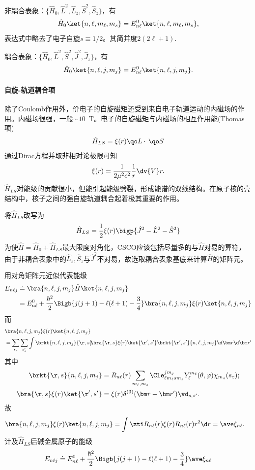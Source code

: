 非耦合表象：$\{\hat H_0,\hat L^2,\hat L_z,\hat S^2,\hat S_z\}$，有 %
\[
	\hat H_0\ket{n,\ell,m_\ell,m_s}=E_{n\ell}^0\ket{n,\ell,m_\ell,m_s},
\]
表达式中略去了电子自旋$s\equiv 1/2$。其简并度$2(2\ell+1)$.

耦合表象：$\{\hat H_0,\hat L^2,\hat S^2,\hat J^2,\hat J_z\}$，有 
\[
	\hat H_0\ket{n,\ell,j,m_j}=E_{n\ell}^0\ket{n,\ell,j,m_j}.
\]
\paragraph{自旋-轨道耦合项}
除了Coulomb作用外，价电子的自旋磁矩还受到来自电子轨道运动的内磁场的作用。内磁场很强，一般$\sim10$~T。电子的自旋磁矩与内磁场的相互作用能(Thomas项)
\begin{align}
	\hat H_{LS}=\xi(r)\qo L\cdot\,\qo S%
\end{align}
通过Dirac方程并取非相对论极限可知
\[
	\xi(r)=\frac1{2\mu^2c^2}\frac1r\dv{V}r.
\]
$\hat H_{LS}$对能级的贡献很小，但能引起能级劈裂，形成能谱的双线结构。在原子核的壳结构中，核子之间的强自旋轨道耦合起着极其重要的作用。

将$\hat H_{LS}$改写为
\[
	\hat H_{LS}=\frac12\xi(r)\bigp{\hat J^2-\hat L^2-\hat S^2}
\]
为使$\hat H=\hat H_0+\hat H_{LS}$最大限度对角化，CSCO应该包括尽量多的与$\hat H$对易的算符，由于非耦合表象中的$\hat L_z,\hat S_z$与$\hat J^2$不对易，故选取耦合表象基底来计算$\hat H$的矩阵元。

用对角矩阵元近似代表能级
\begin{align*}
	E_{n\ell j}&\doteq\bra{n,\ell,j,m_j}\hat H\ket{n,\ell,j,m_j}\\
	&=E_{n\ell}^0+\frac{\hbar^2}2\Bigb{j(j+1)-\ell(\ell+1)-\frac34}\bra{n,\ell,j,m_j}\xi(r)\ket{n,\ell,j,m_j}
\end{align*}
而
\begin{align*}
	&\bra{n,\ell,j,m_j}\xi(r)\ket{n,\ell,j,m_j}\\
	&=\sum_{s_z}\sum_{s_z'}\int\brkt{n,\ell,j,m_j}{\r,s}\hspace{-3pt}\bra{\r,s}\xi(r)\ket{\r',s'}\brkt{\r',s'}{n,\ell,j,m_j}\d\bm r\d\bm r'
\end{align*}
其中 
\begin{align*}
	\brkt{\r,s}{n,\ell,j,m_j}&=R_{n\ell}(r)\sum_{m_\ell,m_s}\Cle_{\ell m_\ell sm_s}^{jm_j}Y_\ell^{m_\ell}(\theta,\varphi)\chi_{m_s}(s_z);\\
	\bra{\r,s}\xi(r)\ket{\r',s'}&=\xi(r)\delta^{(3)}(\bm r-\bm r')\vd_{s,s'}.
\end{align*}
故
\begin{align*}
	\bra{n,\ell,j,m_j}\xi(r)\ket{n,\ell,j,m_j}&=\int\zti R_{n\ell}(r)\xi(r)R_{n\ell}(r)r^2\d r%
	=\ave\xi_{n\ell}.
\end{align*}
计及$\hat H_{LS}$后碱金属原子的能级
\[
E_{n\ell j}\doteq E_{n\ell}^0+\frac{\hbar^2}2\Bigb{j(j+1)-\ell(\ell+1)-\frac34}\ave\xi_{n\ell}
\]

